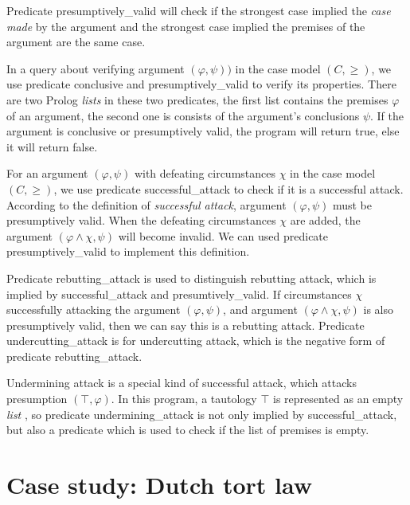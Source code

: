 \documentclass{IOS-Book-Article}
\begin{document}
Predicate {\mf presumptively\_valid} will check if the strongest case implied the \textit{case made} by the argument and the strongest case implied the premises of the argument are the same case. 

In a query about verifying argument $(\varphi, \psi))$ in the case model $(C, \geq)$, we use predicate {\mf conclusive} and {\mf presumptively\_valid} to verify its properties. There are two Prolog \textit{lists} in these two predicates, the first list contains the premises $\varphi$ of an argument, the second one is consists of the argument's conclusions $\psi$. If the argument is conclusive or presumptively valid, the program will return {\mf true}, else it will return {\mf false}.

For an argument $(\varphi, \psi)$ with defeating circumstances $\chi$ in the case model $(C, \geq)$, we use predicate {\mf successful\_attack} to check if it is a successful attack. According to the definition of \textit{successful attack}, argument $(\varphi, \psi)$ must be presumptively valid. When the defeating circumstances $\chi$ are added, the argument $(\varphi \wedge \chi, \psi)$ will become invalid. We can used predicate {\mf presumptively\_valid} to implement this definition.

Predicate {\mf rebutting\_attack} is used to distinguish rebutting attack, which is implied by {\mf successful\_attack} and {\mf presumtively\_valid}. If circumstances $\chi$ successfully attacking the argument  $(\varphi, \psi)$, and argument $(\varphi \wedge \chi, \psi)$ is also presumptively valid, then we can say this is a rebutting attack. Predicate {\mf undercutting\_attack} is for undercutting attack, which is the negative form of predicate {\mf rebutting\_attack}.

Undermining attack is a special kind of successful attack, which attacks presumption $(\top, \varphi)$. In this program, a tautology $\top$ is represented as an empty \textit{list} {\mf [ ]}, so predicate {\mf undermining\_attack} is not only implied by {\mf successful\_attack}, but also a predicate which is used to check if the list of premises is empty.

\section{Case study: Dutch tort law}


\end{document}
